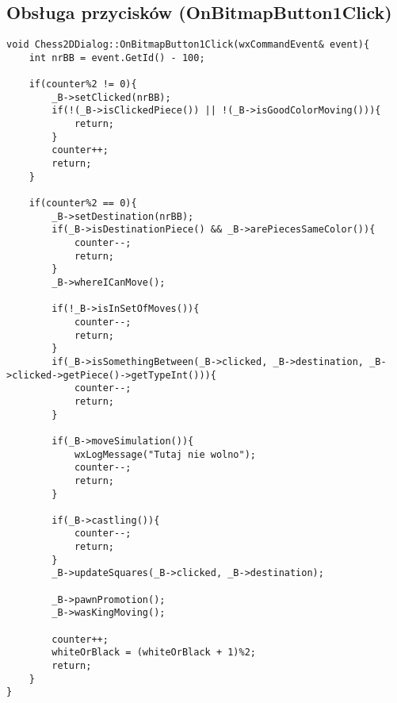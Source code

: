 \documentclass[]{report}
\begin{document}
\begin{flushleft}
\subsection*{Obsługa przycisków (OnBitmapButton1Click)}

\begin{lstlisting}
void Chess2DDialog::OnBitmapButton1Click(wxCommandEvent& event){
	int nrBB = event.GetId() - 100;
	
	if(counter%2 != 0){
		_B->setClicked(nrBB);
		if(!(_B->isClickedPiece()) || !(_B->isGoodColorMoving())){
			return;
		}
		counter++;
		return;
	}
	
	if(counter%2 == 0){
		_B->setDestination(nrBB);
		if(_B->isDestinationPiece() && _B->arePiecesSameColor()){
			counter--;
			return;
		}
		_B->whereICanMove();
		
		if(!_B->isInSetOfMoves()){
			counter--;
			return;
		}
		if(_B->isSomethingBetween(_B->clicked, _B->destination, _B->clicked->getPiece()->getTypeInt())){
			counter--;
			return;
		}

		if(_B->moveSimulation()){
			wxLogMessage("Tutaj nie wolno");
			counter--;
			return;
		}

		if(_B->castling()){
			counter--;
			return;
		}
		_B->updateSquares(_B->clicked, _B->destination);
		
		_B->pawnPromotion();
		_B->wasKingMoving();
		
		counter++;
		whiteOrBlack = (whiteOrBlack + 1)%2;
		return;
	}
}
\end{lstlisting}


\end{flushleft}
\end{document}
